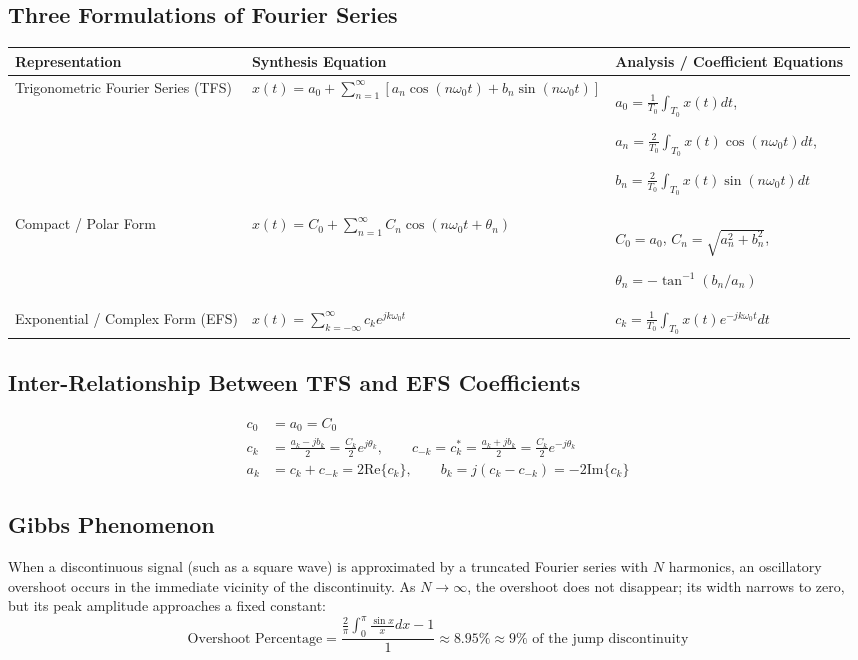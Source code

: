 \documentclass[12pt,a4paper]{article}
\renewcommand{\arraystretch}{1.45}
\begin{document}
\subsection{Three Formulations of Fourier Series}

\par\vspace{6pt}\noindent
\begingroup
\setlength{\tabcolsep}{5pt}
\setlength{\extrarowheight}{3pt}
\renewcommand{\arraystretch}{1.4}
\begin{tabularx}{\linewidth}{|B{4cm}|Y|Y|}
\hline
\textbf{Representation} & \textbf{Synthesis Equation} & \textbf{Analysis / Coefficient Equations} \\
\hline
Trigonometric Fourier Series (TFS) & $x(t) = a_0 + \sum_{n=1}^\infty [a_n \cos(n\omega_0 t) + b_n \sin(n\omega_0 t)]$ & $a_0 = \frac{1}{T_0} \int_{T_0} x(t) dt$, \par $a_n = \frac{2}{T_0} \int_{T_0} x(t) \cos(n\omega_0 t) dt$, \par $b_n = \frac{2}{T_0} \int_{T_0} x(t) \sin(n\omega_0 t) dt$ \\
\hline
Compact / Polar Form & $x(t) = C_0 + \sum_{n=1}^\infty C_n \cos(n\omega_0 t + \theta_n)$ & $C_0 = a_0$, \quad $C_n = \sqrt{a_n^2 + b_n^2}$, \par $\theta_n = -\tan^{-1}(b_n / a_n)$ \\
\hline
Exponential / Complex Form (EFS) & $x(t) = \sum_{k=-\infty}^\infty c_k e^{j k \omega_0 t}$ & $c_k = \frac{1}{T_0} \int_{T_0} x(t) e^{-j k \omega_0 t} dt$ \\
\hline
\end{tabularx}
\endgroup

\subsection{Inter-Relationship Between TFS and EFS Coefficients}
\begin{align}
  c_0 &= a_0 = C_0 \\
  c_k &= \frac{a_k - j b_k}{2} = \frac{C_k}{2} e^{j\theta_k}, \qquad c_{-k} = c_k^* = \frac{a_k + j b_k}{2} = \frac{C_k}{2} e^{-j\theta_k} \\
  a_k &= c_k + c_{-k} = 2 \text{Re}\{c_k\}, \qquad b_k = j(c_k - c_{-k}) = -2 \text{Im}\{c_k\}
\end{align}

\subsection{Gibbs Phenomenon}
When a discontinuous signal (such as a square wave) is approximated by a truncated Fourier series with $N$ harmonics, an oscillatory overshoot occurs in the immediate vicinity of the discontinuity. As $N \to \infty$, the overshoot does not disappear; its width narrows to zero, but its peak amplitude approaches a fixed constant:
\begin{equation}
  \text{Overshoot Percentage} = \frac{\frac{2}{\pi} \int_0^\pi \frac{\sin x}{x} dx - 1}{1} \approx 8.95\% \approx 9\% \text{ of the jump discontinuity}
\end{equation}
\end{document}
